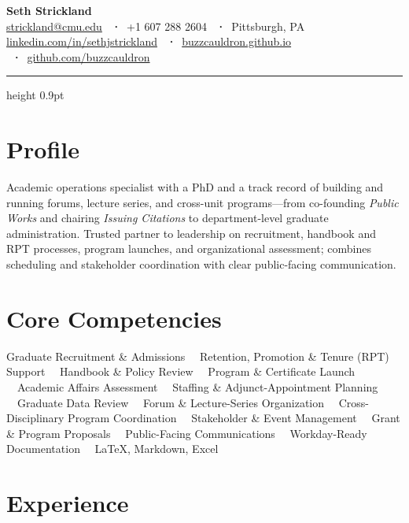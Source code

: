 \documentclass[11pt,letterpaper]{article}
\begin{document}
{\Huge\bfseries\color{accent} Seth Strickland}\\[5pt]
{\small
  \href{mailto:strickland@cmu.edu}{strickland@cmu.edu} \ \textbf{·}\
  +1 607 288 2604 \ \textbf{·}\ Pittsburgh, PA\\[2pt]
  \href{https://linkedin.com/in/sethjstrickland}{linkedin.com/in/sethjstrickland} \ \textbf{·}\
  \href{https://buzzcauldron.github.io}{buzzcauldron.github.io} \ \textbf{·}\
  \href{https://github.com/buzzcauldron}{github.com/buzzcauldron}
}\\[4pt]
{\color{rulecol}\hrule height 0.9pt}
\vspace{4pt}

\section{Profile}
Academic operations specialist with a PhD and a track record of building and running forums,
lecture series, and cross-unit programs---from co-founding \textit{Public Works} and chairing
\textit{Issuing Citations} to department-level graduate administration. Trusted partner to
leadership on recruitment, handbook and RPT processes, program launches, and organizational
assessment; combines scheduling and stakeholder coordination with clear public-facing
communication.

\section{Core Competencies}
Graduate Recruitment \& Admissions \ \textbullet\ Retention, Promotion \& Tenure (RPT) Support
\ \textbullet\ Handbook \& Policy Review \ \textbullet\ Program \& Certificate Launch
\ \textbullet\ Academic Affairs Assessment \ \textbullet\ Staffing \& Adjunct-Appointment Planning
\ \textbullet\ Graduate Data Review \ \textbullet\ Forum \& Lecture-Series Organization
\ \textbullet\ Cross-Disciplinary Program Coordination \ \textbullet\ Stakeholder \& Event Management
\ \textbullet\ Grant \& Program Proposals \ \textbullet\ Public-Facing Communications
\ \textbullet\ Workday-Ready Documentation \ \textbullet\ LaTeX, Markdown, Excel

\section{Experience}
\end{document}
